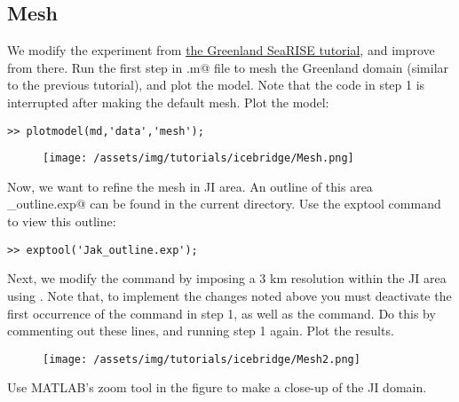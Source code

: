 \subsection{Mesh} %
We modify the experiment from \href{../greenland}{the Greenland SeaRISE tutorial}, and improve from there. Run the first step in \verb@runme.m@ file to mesh the Greenland domain (similar to the previous tutorial), and plot the model. Note that the code in step 1 is interrupted after making the default mesh. Plot the model:
\begin{verbatim}>> plotmodel(md,'data','mesh');\end{verbatim}
\begin{figure}[H]
	\begin{center}
		\texttt{[image: /assets/img/tutorials/icebridge/Mesh.png]}
	\end{center}
\end{figure}
Now, we want to refine the mesh in JI area. An outline of this area \verb@Jak_outline.exp@ can be found in the current directory. Use the exptool command to view this outline:
\begin{verbatim}>> exptool('Jak_outline.exp');\end{verbatim}

Next, we modify the \verb@bamg@ command by imposing a 3 km resolution within the JI area using \verb@hmaxVertices@. Note that, to implement the changes noted above you must deactivate the first occurrence of the \verb@bamg@ command in step 1, as well as the \verb@return@ command. Do this by commenting out these lines, and running step 1 again. Plot the results.
\begin{figure}[H]
	\begin{center}
		\texttt{[image: /assets/img/tutorials/icebridge/Mesh2.png]}
	\end{center}
\end{figure}
Use MATLAB's zoom tool in the figure to make a close-up of the JI domain.
